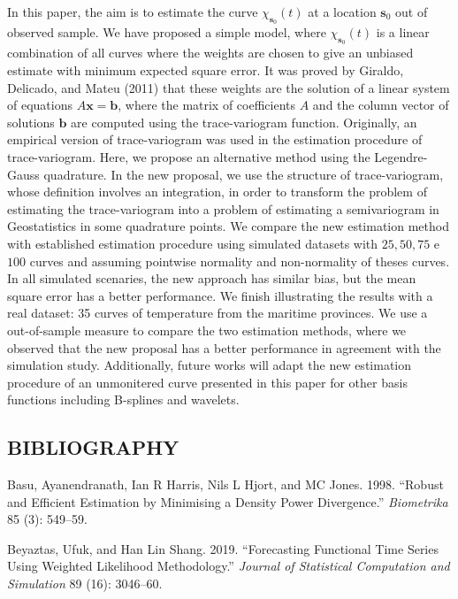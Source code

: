 \documentclass[
  12pt,
]{article}
\theoremstyle{definition}
\theoremstyle{definition}
\theoremstyle{definition}
\theoremstyle{remark}
\begin{document}
In this paper, the aim is to estimate the curve \(\chi_{\bm{s}_0}(t)\) at a location \(\bm{s}_0\) out of observed sample. We have proposed a simple model, where \(\chi_{\bm{s}_0}(t)\) is a linear combination of all curves where the weights are chosen to give an unbiased estimate with minimum expected square error. It was proved by Giraldo, Delicado, and Mateu (2011) that these weights are the solution of a linear system of equations \(A \bm{x} = \bm{b}\), where the matrix of coefficients \(A\) and the column vector of solutions \(\bm{b}\) are computed using the trace-variogram function. Originally, an empirical version of trace-variogram was used in the estimation procedure of trace-variogram. Here, we propose an alternative method using the Legendre-Gauss quadrature. In the new proposal, we use the structure of trace-variogram, whose definition involves an integration, in order to transform the problem of estimating the trace-variogram into a problem of estimating a semivariogram in Geostatistics in some quadrature points. We compare the new estimation method with established estimation procedure using simulated datasets with \(25,50,75\) e \(100\) curves and assuming pointwise normality and non-normality of theses curves. In all simulated scenaries, the new approach has similar bias, but the mean square error has a better performance. We finish illustrating the results with a real dataset: 35 curves of temperature from the maritime provinces. We use a out-of-sample measure to compare the two estimation methods, where we observed that the new proposal has a better performance in agreement with the simulation study. Additionally, future works will adapt the new estimation procedure of an unmonitered curve presented in this paper for other basis functions including B-splines and wavelets.

\newpage

\hypertarget{bibliography}{%
\subsection*{BIBLIOGRAPHY}\label{bibliography}}

\hypertarget{refs}{}
\leavevmode\hypertarget{ref-basu1998robust}{}%
Basu, Ayanendranath, Ian R Harris, Nils L Hjort, and MC Jones. 1998. ``Robust and Efficient Estimation by Minimising a Density Power Divergence.'' \emph{Biometrika} 85 (3): 549--59.

\leavevmode\hypertarget{ref-beyaztas2019forecasting}{}%
Beyaztas, Ufuk, and Han Lin Shang. 2019. ``Forecasting Functional Time Series Using Weighted Likelihood Methodology.'' \emph{Journal of Statistical Computation and Simulation} 89 (16): 3046--60.
\end{document}
